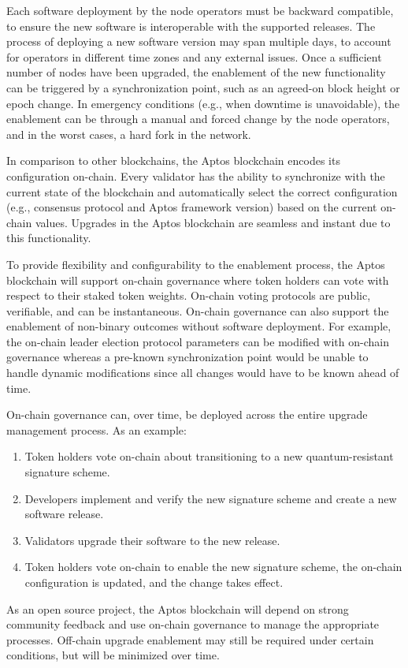 \documentclass{article}
\begin{document}
Each software deployment by the node operators must be backward compatible, to ensure the new software is interoperable with the supported releases. The process of deploying a new software version may span multiple days, to account for operators in different time zones and any external issues. Once a sufficient number of nodes have been upgraded, the enablement of the new functionality can be triggered by a synchronization point, such as an agreed-on block height or epoch change. In emergency conditions (e.g., when downtime is unavoidable), the enablement can be through a manual and forced change by the node operators, and in the worst cases, a hard fork in the network.

In comparison to other blockchains, the Aptos blockchain encodes its configuration on-chain. Every validator has the ability to synchronize with the current state of the blockchain and automatically select the correct configuration (e.g., consensus protocol and Aptos framework version) based on the current on-chain values. Upgrades in the Aptos blockchain are seamless and instant due to this functionality.

To provide flexibility and configurability to the enablement process, the Aptos blockchain will support on-chain governance where token holders can vote with respect to their staked token weights. On-chain voting protocols are public, verifiable, and can be instantaneous. On-chain governance can also support the enablement of non-binary outcomes without software deployment. For example, the on-chain leader election protocol parameters can be modified with on-chain governance whereas a pre-known synchronization point would be unable to handle dynamic modifications since all changes would have to be known ahead of time.

On-chain governance can, over time, be deployed across the entire upgrade management process. As an example:
\begin{enumerate}
\item Token holders vote on-chain about transitioning to a new quantum-resistant signature scheme.
\item Developers implement and verify the new signature scheme and create a new software release.
\item Validators upgrade their software to the new release.
\item Token holders vote on-chain to enable the new signature scheme, the on-chain configuration is updated, and the change takes effect.
\end{enumerate}
As an open source project, the Aptos blockchain will depend on strong community feedback and use on-chain governance to manage the appropriate processes. Off-chain upgrade enablement may still be required under certain conditions, but will be minimized over time.
\end{document}
